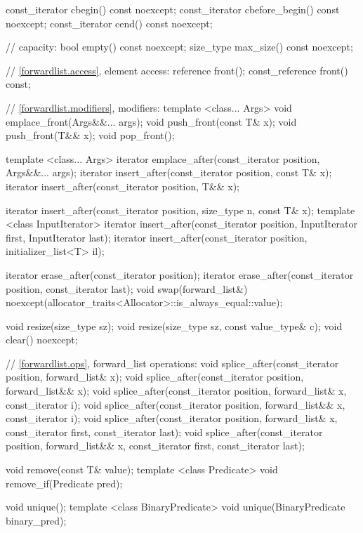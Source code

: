 \begin{codeblock}
{{    const_iterator cbegin() const noexcept;
    const_iterator cbefore_begin() const noexcept;
    const_iterator cend() const noexcept;

    // capacity:
    bool      empty() const noexcept;
    size_type max_size() const noexcept;

    // \ref{forwardlist.access}, element access:
    reference front();
    const_reference front() const;

    // \ref{forwardlist.modifiers}, modifiers:
    template <class... Args> void emplace_front(Args&&... args);
    void push_front(const T& x);
    void push_front(T&& x);
    void pop_front();

    template <class... Args> iterator emplace_after(const_iterator position, Args&&... args);
    iterator insert_after(const_iterator position, const T& x);
    iterator insert_after(const_iterator position, T&& x);

    iterator insert_after(const_iterator position, size_type n, const T& x);
    template <class InputIterator>
      iterator insert_after(const_iterator position, InputIterator first, InputIterator last);
    iterator insert_after(const_iterator position, initializer_list<T> il);

    iterator erase_after(const_iterator position);
    iterator erase_after(const_iterator position, const_iterator last);
    void swap(forward_list&)
      noexcept(allocator_traits<Allocator>::is_always_equal::value);

    void resize(size_type sz);
    void resize(size_type sz, const value_type& c);
    void clear() noexcept;

    // \ref{forwardlist.ops}, forward_list operations:
    void splice_after(const_iterator position, forward_list& x);
    void splice_after(const_iterator position, forward_list&& x);
    void splice_after(const_iterator position, forward_list& x,
                      const_iterator i);
    void splice_after(const_iterator position, forward_list&& x,
                      const_iterator i);
    void splice_after(const_iterator position, forward_list& x,
                      const_iterator first, const_iterator last);
    void splice_after(const_iterator position, forward_list&& x,
                      const_iterator first, const_iterator last);

    void remove(const T& value);
    template <class Predicate> void remove_if(Predicate pred);

    void unique();
    template <class BinaryPredicate> void unique(BinaryPredicate binary_pred);

}}
\end{codeblock}
